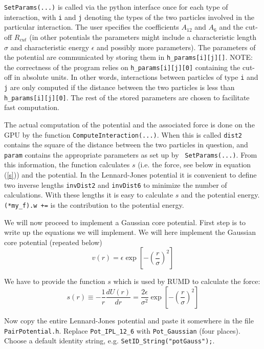 \verb|SetParams(...)| is called via the python interface once for
each type of interaction, with \verb|i| and \verb|j| denoting the types
of the two particles involved in the particular
interaction. The user specifies the coefficients $A_{12}$ and $A_6$
and the cut-off $R_{cut}$ (in other potentials the parameters might include a
characteristic length $\sigma$ and 
characteristic energy $\epsilon$ and possibly more parameters).
The parameters of the potential are communicated by storing them in 
\verb=h_params[i][j][]=.  NOTE: the correctness of the program relies on \verb=h_params[i][j][0]= containing the cut-off in absolute units. 
In other words, interactions between particles of type \verb|i| and \verb|j|
are only computed if the distance between the two particles is less than
 \verb=h_params[i][j][0]=. The rest
of the stored parameters are chosen to facilitate fast computation.

The actual computation of the potential and the associated force 
is done on the GPU by the 
function \verb|ComputeInteraction(...)|. When this is called 
\verb|dist2| contains the square of the distance between the two 
particles in question, and \verb|param| contains the appropriate 
parameters as set up by  \verb| SetParams(...)|. From this information, 
the function calculates  $s$ (i.e. the force, see below in equation
(\ref{s})) and the potential. In the Lennard-Jones
potential it is convenient to define two inverse lengths
\verb|invDist2| and \verb|invDist6| to minimize the number of
calculations. With these
lengths it is easy to calculate $s$ and the potential energy.
\verb|(*my_f).w +=| is the contribution to the potential energy.

We will now proceed to implement a Gaussian core potential. First 
step is to write up the equations we will implement. We will here 
implement the Gaussian core potential (repeated below)
\begin{equation}
   v(r) = \epsilon \exp\left[ -\left( \frac{r}{\sigma} \right)^2 \right]  
\end{equation}

We have to provide the function $s$ which is used 
by RUMD to calculate the force:
\begin{equation}
   s(r) \equiv -\frac{1}{r}\frac{d U(r)}{d r} = \frac{2 \epsilon}{\sigma^2}\exp\left[ -\left( \frac{r}{\sigma} \right)^2 \right] \label{s}
\end{equation}

Now copy the entire Lennard-Jones potential and paste it somewhere in the file
\verb|PairPotential.h|. Replace \verb|Pot_IPL_12_6| with \verb|Pot_Gaussian| 
(four places).
Choose a default identity string, e.g. \verb|SetID_String("potGauss");|.

